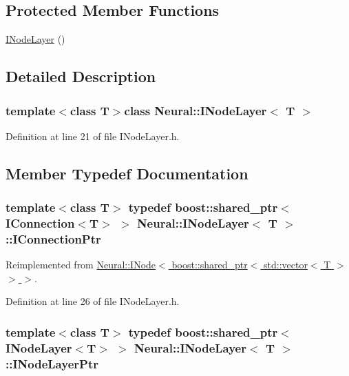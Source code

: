 \subsection*{Protected Member Functions}
\begin{DoxyCompactItemize}
\item 
\hyperlink{class_neural_1_1_i_node_layer_a37e89a60c902b7cd45a3e29ca4e10479}{INodeLayer} ()
\end{DoxyCompactItemize}


\subsection{Detailed Description}
\subsubsection*{template$<$class T$>$class Neural::INodeLayer$<$ T $>$}



Definition at line 21 of file INodeLayer.h.



\subsection{Member Typedef Documentation}
\hypertarget{class_neural_1_1_i_node_layer_ab117db196ffa2ff59c58bc3a4fbdfa09}{
\subsubsection[{IConnectionPtr}]{\setlength{\rightskip}{0pt plus 5cm}template$<$class T$>$ typedef boost::shared\_\-ptr$<$ {\bf IConnection}$<$T$>$ $>$ {\bf Neural::INodeLayer}$<$ T $>$::{\bf IConnectionPtr}}}
\label{class_neural_1_1_i_node_layer_ab117db196ffa2ff59c58bc3a4fbdfa09}


Reimplemented from \hyperlink{class_neural_1_1_i_node_a5243be0a422bcddc5a71a79920d09fd1}{Neural::INode$<$ boost::shared\_\-ptr$<$ std::vector$<$ T $>$ $>$ $>$}.



Definition at line 26 of file INodeLayer.h.

\hypertarget{class_neural_1_1_i_node_layer_a63927dd7063f14e4e8df5d9180c85309}{
\subsubsection[{INodeLayerPtr}]{\setlength{\rightskip}{0pt plus 5cm}template$<$class T$>$ typedef boost::shared\_\-ptr$<$ {\bf INodeLayer}$<$T$>$ $>$ {\bf Neural::INodeLayer}$<$ T $>$::{\bf INodeLayerPtr}}}
\label{class_neural_1_1_i_node_layer_a63927dd7063f14e4e8df5d9180c85309}


